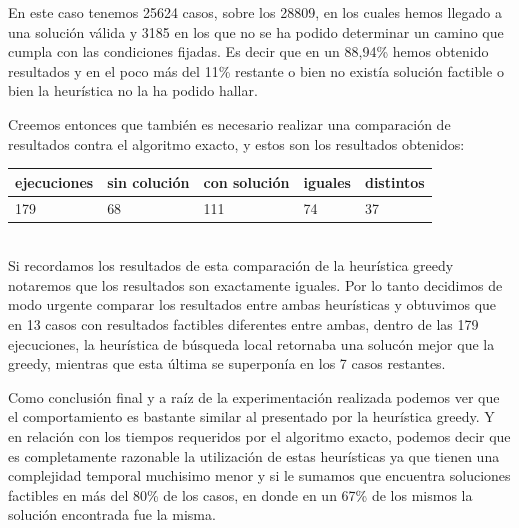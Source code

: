 En este caso tenemos 25624 casos, sobre los 28809, en los cuales hemos llegado a una soluci\'on v\'alida y 3185 en los que no se ha podido determinar un camino que cumpla con las condiciones fijadas. Es decir que en un 88,94\% hemos obtenido resultados y en el poco m\'as del 11\% restante o bien no exist\'ia soluci\'on factible o bien la heur\'istica no la ha podido hallar.

Creemos entonces que tambi\'en es necesario realizar una comparaci\'on de resultados contra el algoritmo exacto, y estos son los resultados obtenidos:

\begin{tabular}{ | l | l | l | l | l | }
\hline
ejecuciones & sin coluci\'on & con soluci\'on & iguales & distintos \\
\hline
179 & 68 & 111 & 74 & 37 \\
\hline
\end{tabular}
\\

Si recordamos los resultados de esta comparaci\'on de la heur\'istica greedy notaremos que los resultados son exactamente iguales. 
Por lo tanto decidimos de modo urgente comparar los resultados entre ambas heur\'isticas y obtuvimos que en 13 casos con resultados factibles diferentes entre ambas, dentro de las 179 ejecuciones, la heur\'istica de b\'usqueda local retornaba una soluc\'on mejor que la greedy, mientras que esta \'ultima se superpon\'ia en los 7 casos restantes.


Como conclusi\'on final y a ra\'iz de la experimentaci\'on realizada podemos ver que el comportamiento es bastante similar al presentado por la heur\'istica greedy. Y en relaci\'on con los tiempos requeridos por el algoritmo exacto, podemos decir que es completamente razonable la utilizaci\'on de estas heur\'isticas ya que tienen una complejidad temporal muchisimo menor y si le sumamos que encuentra soluciones factibles en m\'as del 80\% de los casos, en donde en un 67\% de los mismos la soluci\'on encontrada fue la misma.

